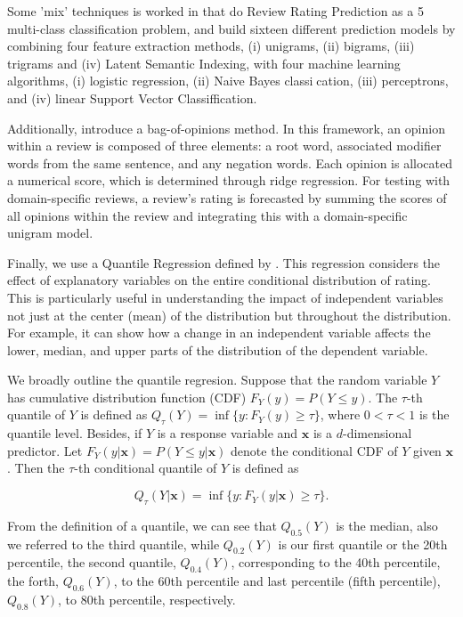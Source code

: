 \documentclass[12pt]{article}
\numberwithin{equation}{section}
\begin{document}
Some 'mix' techniques is worked in \cite{Asghar2016} that do Review Rating Prediction as a 5 multi-class classification problem, and build sixteen different prediction models by combining four feature extraction methods, (i) unigrams, (ii) bigrams, (iii) trigrams and (iv) Latent Semantic Indexing, with four machine learning algorithms, (i) logistic regression, (ii) Naive Bayes classication, (iii) perceptrons, and (iv) linear Support Vector Classiffication.

Additionally, \cite{Qu2010}  introduce a bag-of-opinions method. In this framework, an opinion within a review is composed of three elements: a root word, associated modifier words from the same sentence, and any negation words. Each opinion is allocated a numerical score, which is determined through ridge regression. For testing with domain-specific reviews, a review's rating is forecasted by summing the scores of all opinions within the review and integrating this with a domain-specific unigram model.

Finally, we use a Quantile Regression defined by \cite{Koenker2005}. This regression considers the effect of explanatory variables on the entire conditional distribution of rating. This is particularly useful in understanding the impact of independent variables not just at the center (mean) of the distribution but throughout the distribution. For example, it can show how a change in an independent variable affects the lower, median, and upper parts of the distribution of the dependent variable.

We broadly outline the quantile regresion. Suppose that the random variable \( Y \) has cumulative distribution function (CDF) \( F_Y(y) = P(Y \le y) \). The \( \tau \)-th quantile of \( Y \) is defined as \( Q_\tau(Y) = \inf\{y : F_Y(y) \geq \tau\} \), where \( 0 < \tau < 1 \) is the quantile level. Besides, if \( Y \) is a response variable and \( \mathbf{x} \) is a \( d \)-dimensional predictor. Let \( F_Y(y|\mathbf{x}) = P(Y \le y|\mathbf{x}) \) denote the conditional CDF of \( Y \) given \( \mathbf{x} \). Then the \( \tau \)-th conditional quantile of \( Y \) is defined as

\[
Q_\tau(Y|\mathbf{x}) = \inf\{y : F_Y(y|\mathbf{x}) \geq \tau\}.
\]

From the definition of a quantile, we can see that \( Q_{0.5}(Y) \) is the median, also we referred to the third quantile, while \( Q_{0.2}(Y) \) is our first quantile or the 20th percentile, the second quantile, \( Q_{0.4}(Y) \), corresponding to the 40th percentile, the forth, \( Q_{0.6}(Y) \), to the 60th percentile and last percentile (fifth percentile), \( Q_{0.8}(Y) \), to 80th percentile, respectively.
\end{document}
